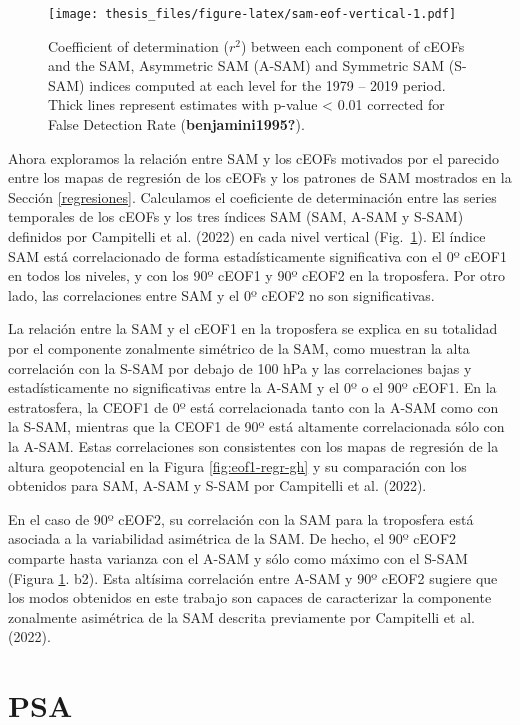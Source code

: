\documentclass[12pt,oneside]{reedthesis}
\begin{document}
\begin{figure}
\centering
\texttt{[image: thesis\_files/figure-latex/sam-eof-vertical-1.pdf]}
\caption{\label{fig:sam-eof-vertical}Coefficient of determination (\(r^2\)) between each component of cEOFs and the SAM, Asymmetric SAM (A-SAM) and Symmetric SAM (S-SAM) indices computed at each level for the 1979 -- 2019 period. Thick lines represent estimates with p-value \textless{} 0.01 corrected for False Detection Rate (\textbf{benjamini1995?}).}
\end{figure}
Ahora exploramos la relación entre SAM y los cEOFs motivados por el parecido entre los mapas de regresión de los cEOFs y los patrones de SAM mostrados en la Sección \ref{regresiones}.
Calculamos el coeficiente de determinación entre las series temporales de los cEOFs y los tres índices SAM (SAM, A-SAM y S-SAM) definidos por Campitelli et al. (2022) en cada nivel vertical (Fig.~\ref{fig:sam-eof-vertical}).
El índice SAM está correlacionado de forma estadísticamente significativa con el 0º cEOF1 en todos los niveles, y con los 90º cEOF1 y 90º cEOF2 en la troposfera.
Por otro lado, las correlaciones entre SAM y el 0º cEOF2 no son significativas.

La relación entre la SAM y el cEOF1 en la troposfera se explica en su totalidad por el componente zonalmente simétrico de la SAM, como muestran la alta correlación con la S-SAM por debajo de 100 hPa y las correlaciones bajas y estadísticamente no significativas entre la A-SAM y el 0º o el 90º cEOF1.
En la estratosfera, la CEOF1 de 0º está correlacionada tanto con la A-SAM como con la S-SAM, mientras que la CEOF1 de 90º está altamente correlacionada sólo con la A-SAM.
Estas correlaciones son consistentes con los mapas de regresión de la altura geopotencial en la Figura \ref{fig:eof1-regr-gh} y su comparación con los obtenidos para SAM, A-SAM y S-SAM por Campitelli et al. (2022).

En el caso de 90º cEOF2, su correlación con la SAM para la troposfera está asociada a la variabilidad asimétrica de la SAM.
De hecho, el 90º cEOF2 comparte hasta varianza con el A-SAM y sólo como máximo con el S-SAM (Figura \ref{fig:sam-eof-vertical}.
b2).
Esta altísima correlación entre A-SAM y 90º cEOF2 sugiere que los modos obtenidos en este trabajo son capaces de caracterizar la componente zonalmente asimétrica de la SAM descrita previamente por Campitelli et al. (2022).

\hypertarget{psa}{%
\section{PSA}\label{psa}}
\end{document}
